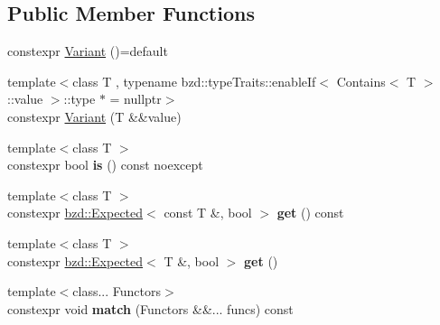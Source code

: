 \subsection*{Public Member Functions}
\begin{DoxyCompactItemize}
\item 
constexpr \hyperlink{classbzd_1_1impl_1_1Variant_a94b14a37ebd4899550f5ce6630715cdf}{Variant} ()=default
\item 
{\footnotesize template$<$class T , typename bzd\+::type\+Traits\+::enable\+If$<$ Contains$<$ T $>$\+::value $>$\+::type $\ast$  = nullptr$>$ }\\constexpr \hyperlink{classbzd_1_1impl_1_1Variant_a814875f9a6cfc7e22972466999a88d2f}{Variant} (T \&\&value)
\item 
\mbox{\label{classbzd_1_1impl_1_1Variant_a562baf45680f0985c52c861f8dbd344d}} 
{\footnotesize template$<$class T $>$ }\\constexpr bool {\bfseries is} () const noexcept
\item 
\mbox{\label{classbzd_1_1impl_1_1Variant_a2c79785352b6a118f05562d4df93727f}} 
{\footnotesize template$<$class T $>$ }\\constexpr \hyperlink{classbzd_1_1impl_1_1Expected}{bzd\+::\+Expected}$<$ const T \&, bool $>$ {\bfseries get} () const
\item 
\mbox{\label{classbzd_1_1impl_1_1Variant_ab69a180ec931f4ab33c5891443811e36}} 
{\footnotesize template$<$class T $>$ }\\constexpr \hyperlink{classbzd_1_1impl_1_1Expected}{bzd\+::\+Expected}$<$ T \&, bool $>$ {\bfseries get} ()
\item 
\mbox{\label{classbzd_1_1impl_1_1Variant_ab34de94c5bfac2ca8662e03757d0a309}} 
{\footnotesize template$<$class... Functors$>$ }\\constexpr void {\bfseries match} (Functors \&\&... funcs) const
\end{DoxyCompactItemize}
